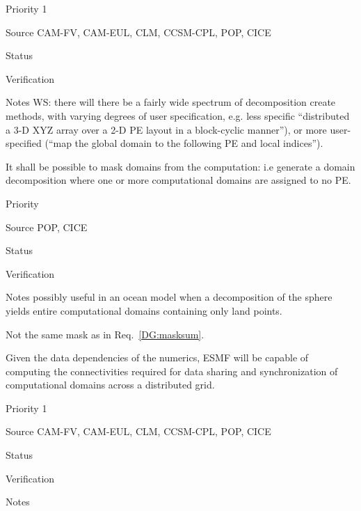 \begin{reqlist}
\item[Priority] 1
\item[Source] CAM-FV, CAM-EUL, CLM, CCSM-CPL, POP, CICE 
\item[Status]
\item[Verification]
\item[Notes] WS:  there will there be a fairly wide spectrum 
of decomposition create methods, with varying degrees of user
specification, e.g. less specific ``distributed a 3-D XYZ array 
over a 2-D PE layout in a block-cyclic manner''), or more 
user-specified (``map the global domain to the following PE 
and local indices'').

\end{reqlist}

 \label{DG:masklayout}

It shall be possible to mask domains from the computation: i.e
generate a domain decomposition where one or more computational
domains are assigned to no PE.

\begin{reqlist}
\item[Priority]
\item[Source] POP, CICE 
\item[Status]
\item[Verification]
\item[Notes] possibly useful in an ocean model when a decomposition
  of the sphere yields entire computational domains containing only
  land points.

  Not the same mask as in Req.~\ref{DG:masksum}.
\end{reqlist}


Given the data dependencies of the numerics, ESMF will be capable of
computing the connectivities required for data sharing and
synchronization of computational domains across a distributed grid.


\begin{reqlist}
\item[Priority] 1
\item[Source] CAM-FV, CAM-EUL, CLM, CCSM-CPL, POP, CICE
\item[Status]
\item[Verification]
\item[Notes] 

\end{reqlist}

